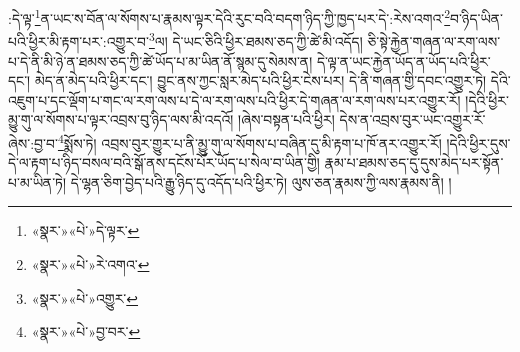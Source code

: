 :དེ་ལྟ་\footnote{«སྣར་»«པེ་»དེ་ལྟར་}ན་ཡང་ས་བོན་ལ་སོགས་པ་རྣམས་ལྟར་དེའི་རུང་བའི་བདག་ཉིད་ཀྱི་ཁྱད་པར་དེ་:རེས་འགའ་\footnote{«སྣར་»«པེ་»རེ་འགའ་}བ་ཉིད་ཡིན་པའི་ཕྱིར་མི་རྟག་པར་:འགྱུར་བ་\footnote{«སྣར་»«པེ་»འགྱུར་}ལ། དེ་ཡང་ཅིའི་ཕྱིར་ཐམས་ཅད་ཀྱི་ཚེ་མི་འདོད། ཅི་སྟེ་རྐྱེན་གཞན་ལ་རག་ལས་པ་དེ་ནི་མི་ཉེ་ན་ཐམས་ཅད་ཀྱི་ཚེ་ཡོད་པ་མ་ཡིན་ནོ་སྙམ་དུ་སེམས་ན། དེ་ལྟ་ན་ཡང་རྐྱེན་ཡོད་ན་ཡོད་པའི་ཕྱིར་དང་། མེད་ན་མེད་པའི་ཕྱིར་དང་། བྱུང་ནས་ཀྱང་སླར་མེད་པའི་ཕྱིར་ངེས་པར། དེ་ནི་གཞན་གྱི་དབང་འགྱུར་ཏེ། དེའི་འཇུག་པ་དང་ལྡོག་པ་གང་ལ་རག་ལས་པ་དེ་ལ་རག་ལས་པའི་ཕྱིར་དེ་གཞན་ལ་རག་ལས་པར་འགྱུར་རོ། །དེའི་ཕྱིར་མྱུ་གུ་ལ་སོགས་པ་ལྟར་འབྲས་བུ་ཉིད་ལས་མི་འདའོ། །ཞེས་བསྟན་པའི་ཕྱིར། དེས་ན་འབྲས་བུར་ཡང་འགྱུར་རོ་ཞེས་:བྱ་བ་\footnote{«སྣར་»«པེ་»བྱ་བར་}སྨོས་ཏེ། འབྲས་བུར་གྱུར་པ་ནི་མྱུ་གུ་ལ་སོགས་པ་བཞིན་དུ་མི་རྟག་པ་ཁོ་ནར་འགྱུར་རོ། །དེའི་ཕྱིར་དུས་དེ་ལ་རྟག་པ་ཉིད་བསལ་བའི་སྒོ་ནས་དངོས་པོར་ཡོད་པ་སེལ་བ་ཡིན་གྱི། རྣམ་པ་ཐམས་ཅད་དུ་དུས་མེད་པར་སྟོན་པ་མ་ཡིན་ཏེ། དེ་ལྷན་ཅིག་བྱེད་པའི་རྒྱུ་ཉིད་དུ་འདོད་པའི་ཕྱིར་ཏེ། ལུས་ཅན་རྣམས་ཀྱི་ལས་རྣམས་ནི། །
